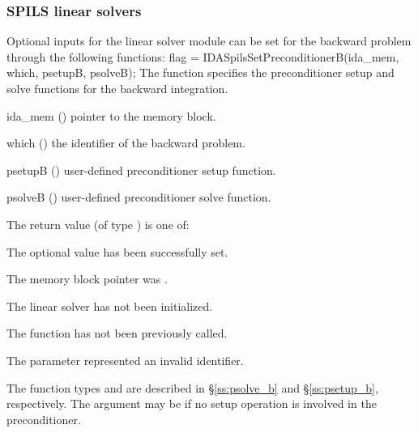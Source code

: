 \subsubsection{SPILS linear solvers}
Optional inputs for the {\idaspils} linear solver module can be set for the backward
problem through the following functions:
{
  flag = IDASpilsSetPreconditionerB(ida\_mem, which, psetupB, psolveB);
}
{
  The function  specifies the preconditioner
  setup and solve functions for the backward integration.
}
{
  \begin{args}[psetupB]
  \item[ida\_mem] ()
    pointer to the {\idas} memory block.
  \item[which] ()
    the identifier of the backward problem.
  \item[psetupB] ()
    user-defined preconditioner setup function.
  \item[psolveB] ()
    user-defined preconditioner solve function.
  \end{args}
}
{
  The return value  (of type ) is one of:
  \begin{args}
  \item[\Id{IDASPILS\_SUCCESS}] 
    The optional value has been successfully set.
  \item[\Id{IDASPILS\_MEM\_NULL}]
    The  memory block pointer was .
  \item[\Id{IDASPILS\_LMEM\_NULL}]
    The {\idaspils} linear solver has not been initialized.
  \item[\Id{IDASPILS\_NO\_ADJ}]
    The function  has not been previously called.
  \item[\Id{IDASPILS\_ILL\_INPUT}]
    The parameter  represented an invalid identifier.
  \end{args}
}
{
   The function types  and  are
   described in \S\ref{ss:psolve_b} and \S\ref{ss:psetup_b}, respectively.
   The  argument may be  if no setup operation is involved
   in the preconditioner.
}

